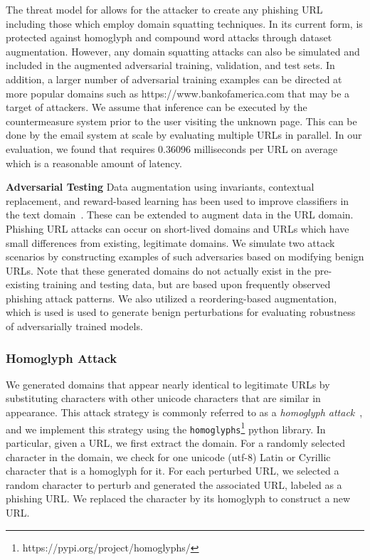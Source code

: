 The threat model for \URLTranSys allows for the attacker to create any phishing URL including those which employ domain squatting techniques. In its current form, \URLTranSys is protected against homoglyph and compound word attacks through dataset augmentation.
However, any domain squatting attacks can also be simulated and included in the augmented adversarial training, validation, and test sets. 
In addition, a larger number of adversarial training examples can be directed at more popular domains such as https://www.bankofamerica.com that may be a target of attackers.
We assume that inference can be executed by the countermeasure system prior to the user visiting the unknown page. 
This can be done by the email system at scale by evaluating multiple URLs in parallel. In our evaluation, we found that \URLTranSys requires 0.36096 milliseconds per URL on average which is a reasonable amount of latency.
 
 \textbf{Adversarial Testing}
 Data augmentation using invariants, contextual replacement, and reward-based learning has been used to improve classifiers in the text domain~\citep{kobayashi2018contextual,hu2019learning}.
 These can be extended to augment data in the URL domain.
 Phishing URL attacks can occur on short-lived domains and URLs which have small differences from existing, legitimate domains.
 We simulate two attack scenarios by constructing examples of such adversaries based on modifying benign URLs.
 Note that these generated domains do not actually exist in the pre-existing training and testing data, but are based upon frequently observed phishing attack patterns.
 We also utilized a reordering-based augmentation, which is used is used to generate benign perturbations for evaluating robustness of adversarially trained models.

 \subsubsection{Homoglyph Attack}
We generated domains that appear nearly identical to legitimate URLs by substituting characters with other unicode characters that are similar in appearance.
This attack strategy is commonly referred to as a \textit{homoglyph attack}~\cite{ji2018deepwordbug,yerima2020high}, and
we implement this strategy using the \texttt{homoglyphs}\footnote{https://pypi.org/project/homoglyphs/} python library.
In particular, given a URL, we first extract the domain.
For a randomly selected character in the domain, we check for one unicode (utf-8) Latin or Cyrillic character that is a homoglyph for it. 
For each perturbed URL, we selected a random character to perturb and generated the associated URL, labeled as a phishing URL.
We replaced the character by its homoglyph to construct a new URL.

